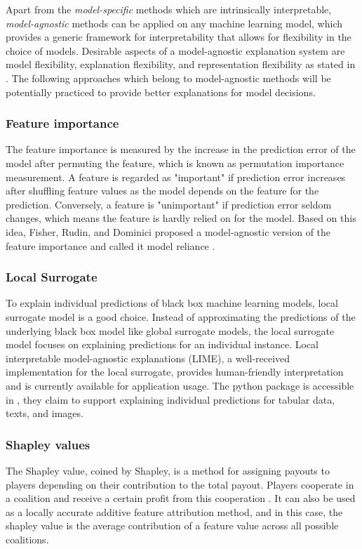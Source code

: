 \documentclass[runningheads]{llncs}
\begin{document}
	Apart from the \textit{model-specific} methods which are intrinsically interpretable, \textit{model-agnostic} methods can be applied on any machine learning model, which provides a generic framework for interpretability that allows for flexibility in the choice of models. Desirable aspects of a model-agnostic explanation system are model flexibility, explanation flexibility, and representation flexibility as stated in \cite{ribeiro2016model}. The following approaches which belong to model-agnostic methods will be potentially practiced to provide better explanations for model decisions. 
	
	\subsubsection{Feature importance}
	The feature importance is measured by the increase in the prediction error of the model after permuting the feature, which is known as permutation importance measurement. A feature is regarded as "important" if prediction error increases after shuffling feature values as the model depends on the feature for the prediction. Conversely, a feature is "unimportant" if prediction error seldom changes, which means the feature is hardly relied on for the model. Based on this idea, Fisher, Rudin, and Dominici proposed a model-agnostic version of the feature importance and called it model reliance \cite{fisher2018model}.
	
	\subsubsection{Local Surrogate}
	To explain individual predictions of black box machine learning models, local surrogate model is a good choice. Instead of approximating the predictions of the underlying black box model like global surrogate models, the local surrogate model focuses on explaining predictions for an individual instance. Local interpretable model-agnostic explanations (LIME), a well-received implementation for the local surrogate, provides human-friendly interpretation and is currently available for application usage. The python package is accessible in \cite{lime}, they claim to support explaining individual predictions for tabular data, texts, and images.
	
	\subsubsection{Shapley values }
	The Shapley value, coined by Shapley, is a method for assigning payouts to players depending on their contribution to the total payout. Players cooperate in a coalition and receive a certain profit from this cooperation \cite{shapley1953value}. It can also be used as a locally accurate additive feature attribution method, and in this case, the shapley value is the average contribution of a feature value across all possible coalitions.
	
\end{document}
